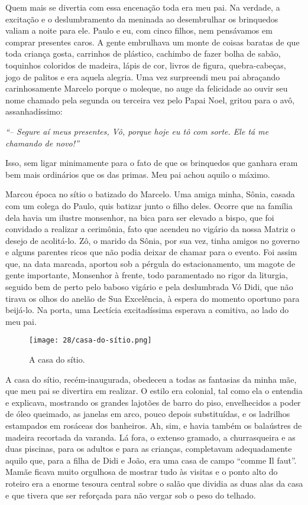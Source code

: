 Quem mais se divertia com essa encenação toda era meu pai.
Na verdade, a excitação e o deslumbramento da meninada ao desembrulhar os brinquedos valiam a noite para ele.
Paulo e eu, com cinco filhos, nem pensávamos em comprar presentes caros.
A gente embrulhava um monte de coisas baratas de que toda criança gosta, carrinhos de plástico, cachimbo de fazer bolha de sabão, toquinhos coloridos de madeira, lápis de cor, livros de figura, quebra-cabeças, jogo de palitos e era aquela alegria.
Uma vez surpreendi meu pai abraçando carinhosamente Marcelo porque o moleque, no auge da felicidade ao ouvir seu nome chamado pela segunda ou terceira vez pelo Papai Noel, gritou para o avô, assanhadíssimo:

\textit{``-- Segure aí meus presentes, Vô, porque hoje eu tô com sorte. Ele tá me chamando de novo!''}

Isso, sem ligar minimamente para o fato de que os brinquedos que ganhara eram bem mais ordinários que os das primas.
Meu pai achou aquilo o máximo.

Marcou época no sítio o batizado do Marcelo.
Uma amiga minha, Sônia, casada com um colega do Paulo, quis batizar junto o filho deles.
Ocorre que na família dela havia um ilustre monsenhor, na bica para ser elevado a bispo, que foi convidado a realizar a cerimônia, fato que acendeu no vigário da nossa Matriz o desejo de acolitá-lo.
Zô, o marido da Sônia, por sua vez, tinha amigos no governo e alguns parentes ricos que não podia deixar de chamar para o evento.
Foi assim que, na data marcada, aportou sob a pérgula do estacionamento, um magote de gente importante, Monsenhor à frente, todo paramentado no rigor da liturgia, seguido bem de perto pelo baboso vigário e pela deslumbrada Vó Didi, que não tirava os olhos do anelão de Sua Excelência, à espera do momento oportuno para beijá-lo.
Na porta, uma Lectícia excitadíssima esperava a comitiva, ao lado do meu pai.

\begin{figure}
\centering
\texttt{[image: 28/casa-do-sítio.png]}
\caption{A casa do sítio.}
\end{figure}

A casa do sítio, recém-inaugurada, obedeceu a todas as fantasias da minha mãe, que meu pai se divertira em realizar.
O estilo era colonial, tal como ela o entendia e explicava, mostrando os grandes lajotões de barro do piso, envelhecidos a poder de óleo queimado, as janelas em arco, pouco depois substituídas, e os ladrilhos estampados em rosáceas dos banheiros.
Ah, sim, e havia também os balaústres de madeira recortada da varanda.
Lá fora, o extenso gramado, a churrasqueira e as duas piscinas, para os adultos e para as crianças, completavam adequadamente aquilo que, para a filha de Didi e João, era uma casa de campo ``comme Il faut''.
Mamãe ficava muito orgulhosa de mostrar tudo às visitas e o ponto alto do roteiro era a enorme tesoura central sobre o salão que dividia as duas alas da casa e que tivera que ser reforçada para não vergar sob o peso do telhado.

